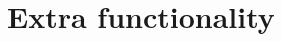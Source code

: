 \documentclass[Orbiter User Manual.tex]{subfiles}
\begin{document}
\section{Extra functionality}

\end{document}
